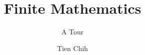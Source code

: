 \documentclass[a4paper,twoside]{scrbook}
\theoremstyle{definition}
\theoremstyle{definition}
\numberwithin{equation}{section}
\begin{document}
\title{Finite Mathematics}
\subtitle{A Tour}
\author{Tien Chih}
\date{}
\frontmatter
\maketitle
\tableofcontents
\mainmatter







\end{document}
